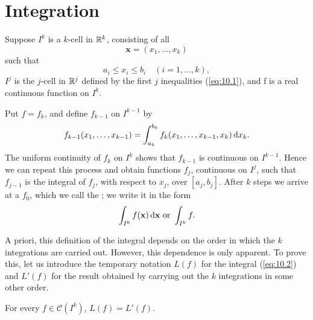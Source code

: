 
\section{Integration}
\begin{mydef}
    \label{mydef:10.1}
    Suppose $I^k$ is a $k$-cell in ${\protect\mathbb R}^k$, consisting of all
    \begin{equation*}
        \mathbf{x} = (x_1,\dots,x_k)
    \end{equation*}
    such that
    \begin{equation}
        \label{eq:10.1}
        a_i \leq x_i \leq b_i
        \quad
        (i = 1,\dots, k) ,
    \end{equation}
    $I^j$ is the $j$-cell in ${\protect\mathbb R}^j$ defined by the first $j$ inequalities (\ref{eq:10.1}), and f is a real continuous function on $I^k$.

    Put $f = f_k$, and define $f_{k-1}$ on $I^{k-1}$ by
    \begin{equation*}
        f_{k-1}(x_1,\dots,x_{k-1}) =
        \int_{a_k}^{b_k} f_k (x_1,\dots,x_{k-1},x_k) \d x_k .
    \end{equation*}
    The uniform continuity of $f_k$ on $I^k$ shows that $f_{k-1}$ is continuous on $I^{k-1}$.
    Hence we can repeat this process and obtain functions $f_j$, continuous on $I^j$,
    such that $f_{j-1}$ is the integral of $f_j$, with respect to $x_j$, over $[a_j, b_j]$.
    After $k$ steps we arrive at a  $f_0$,
    which we call the ;
    we write it in the form
    \begin{equation}
        \label{eq:10.2}
        \int_{I^k} f(\mathbf{x}) \d \mathbf{x}
        \text{  or  }
        \int_{I^k} f.
    \end{equation}

    A priori, this definition of the integral depends on the order in which the $k$ integrations are carried out.
    However, this dependence is only apparent.
    To prove this, let us introduce the temporary notation $L(f)$ for the integral (\ref{eq:10.2}) and $L'(f)$ for the result obtained by carrying out the $k$ integrations in some other order.
\end{mydef}

\begin{thm}
    \label{thm:10.2}
    For every $f \in \mathscr{C}(I^k)$, $L(f) = L'(f)$.
\end{thm}

